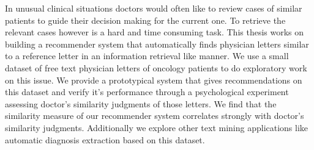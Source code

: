\documentclass[Thesis.tex]{subfiles}
\begin{document}
\setlength{\parindent}{0cm}
In unusual clinical situations doctors would often like to review cases of similar patients to guide their decision making for the current one. To retrieve the relevant cases however is a hard and time consuming task. This thesis works on building a recommender system that automatically finds physician letters similar to a reference letter in an information retrieval like manner. We use a small dataset of free text physician letters of oncology patients to do exploratory work on this issue. We provide a prototypical system that gives recommendations on this dataset and verify it's performance through a psychological experiment assessing doctor's similarity judgments of those letters. We find that the similarity measure of our recommender system correlates strongly with doctor's similarity judgments. Additionally we explore other text mining applications like automatic diagnosis extraction based on this dataset.
\end{document}
